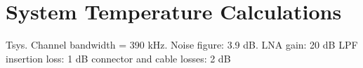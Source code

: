 \section{System Temperature Calculations}
Tsys.
Channel bandwidth = 390 kHz. 
Noise figure: 3.9 dB. 
LNA gain: 20 dB
LPF insertion loss: 1 dB
connector and cable losses: 2 dB
